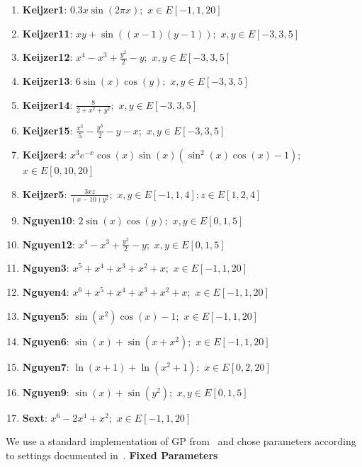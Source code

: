 \begin{enumerate}[noitemsep]
\item \textbf{Keijzer1}: $0.3x \sin(2 \pi x);$ $x \in E[-1,1,20]$
\item \textbf{Keijzer11}: $x y+\sin((x-1)(y-1));$ $x, y \in E[-3,3,5]$
\item \textbf{Keijzer12}: $x^{4}-x^{3}+\frac{y^{2}}{2}-y;$ $x, y \in E[-3,3,5]$
\item \textbf{Keijzer13}: $6 \sin(x) \cos(y);$ $x, y \in E[-3,3,5]$
\item \textbf{Keijzer14}: $\frac{8}{2 + x^{2} + y^{2}};$ $x,y \in E[-3,3,5]$
\item \textbf{Keijzer15}: $\frac{x^{3}}{5} - \frac{y^{3}}{2} - y - x;$ $x, y \in E[-3,3,5]$
\item \textbf{Keijzer4}: $x^{3} e^{-x} \cos(x) \sin(x) (\sin^{2}(x) \cos(x) - 1);$ $x \in E[0,10,20]$
\item \textbf{Keijzer5}: $\frac{3 x z}{(x - 10) y^{2}};$ $x,y \in E[-1,1,4]; z \in E[1,2,4]$
\item \textbf{Nguyen10}: $2 \sin(x) \cos(y);$ $x,y \in E[0,1,5]$
\item \textbf{Nguyen12}: $x^{4} - x^{3} + \frac{y^{2}}{2} - y;$ $x,y \in E[0,1,5]$
\item \textbf{Nguyen3}: $x^{5} + x^{4} + x^{3} + x^{2} + x;$ $x \in E[-1,1,20]$
\item \textbf{Nguyen4}: $x^{6} + x^{5} + x^{4} + x^{3} + x^{2} + x;$ $x \in E[-1,1,20]$
\item \textbf{Nguyen5}: $\sin(x^{2}) \cos(x) - 1;$ $x \in E[-1,1,20]$
\item \textbf{Nguyen6}: $\sin(x) + \sin(x + x^{2});$ $x \in E[-1,1,20]$
\item \textbf{Nguyen7}: $\ln(x + 1) + \ln(x^{2} + 1);$ $x \in E[0,2,20]$
\item \textbf{Nguyen9}: $\sin(x) + \sin(y^{2});$ $x,y \in E[0,1,5]$
\item \textbf{Sext}: $x^{6} - 2 x^{4} + x^{2};$ $x \in E[-1,1,20]$
\end{enumerate}

We use a standard implementation of GP from~\cite{} and chose parameters according to settings documented in~\cite{krawiecGECCO14}.
\textbf{Fixed Parameters}\label{appendix:fixed_parameters}

